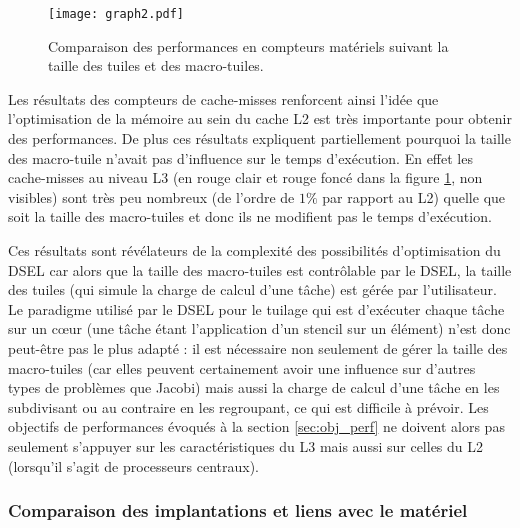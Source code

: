 \begin{figure}[!h]
  \caption{Comparaison des performances en compteurs matériels suivant la taille des tuiles et des macro-tuiles.}
  \label{graph:comp_tuile_cmiss}
  \texttt{[image: graph2.pdf]}
\end{figure}

Les résultats des compteurs de cache-misses renforcent ainsi l'idée que l'optimisation de la mémoire au sein du cache L2 est très importante pour obtenir des performances. De plus ces résultats expliquent partiellement pourquoi la taille des macro-tuile n'avait pas d'influence sur le temps d'exécution. En effet les cache-misses au niveau L3 (en rouge clair et rouge foncé dans la figure \ref{graph:comp_tuile_cmiss}, non visibles) sont très peu nombreux (de l'ordre de $1\%$ par rapport au L2) quelle que soit la taille des macro-tuiles et donc ils ne modifient pas le temps d'exécution.

Ces résultats sont révélateurs de la complexité des possibilités d'optimisation du DSEL car alors que la taille des macro-tuiles est contrôlable par le DSEL, la taille des tuiles (qui simule la charge de calcul d'une tâche) est gérée par l'utilisateur. Le paradigme utilisé par le DSEL pour le tuilage qui est d'exécuter chaque tâche sur un cœur (une tâche étant l'application d'un stencil sur un élément) n'est donc peut-être pas le plus adapté : il est nécessaire non seulement de gérer la taille des macro-tuiles (car elles peuvent certainement avoir une influence sur d'autres types de problèmes que Jacobi) mais aussi la charge de calcul d'une tâche en les subdivisant ou au contraire en les regroupant, ce qui est difficile à prévoir. Les objectifs de performances évoqués à la section \ref{sec:obj_perf} ne doivent alors pas seulement s'appuyer sur les caractéristiques du L3 mais aussi sur celles du L2 (lorsqu'il s'agit de processeurs centraux).


\subsubsection*{Comparaison des implantations et liens avec le matériel}

